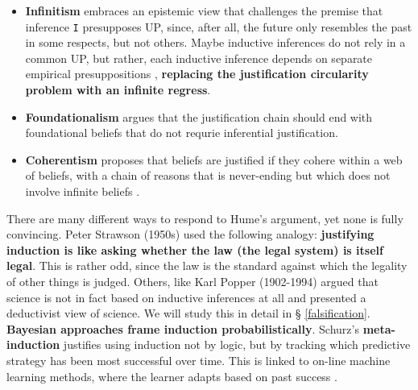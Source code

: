 \documentclass[
  12pt,
]{book}
\providecommand{\tightlist}{%
  \setlength{\itemsep}{0pt}\setlength{\parskip}{0pt}}
\begin{document}
\begin{itemize}
\tightlist
\item
  \textbf{Infinitism} embraces an epistemic view that challenges the premise that inference \texttt{I} presupposes UP, since, after all, the future only resembles the past in some respects, but not others. Maybe inductive inferences do not rely in a common UP, but rather, each inductive inference depends on separate empirical presuppositions \citep{sep-induction-problem}, \textbf{replacing the justification circularity problem with an infinite regress}.
\item
  \textbf{Foundationalism} argues that the justification chain should end with foundational beliefs that do not requrie inferential justification.
\item
  \textbf{Coherentism} proposes that beliefs are justified if they cohere within a web of beliefs, with a chain of reasons that is never-ending but which does not involve infinite beliefs \citep{sep-justep-coherence}.
\end{itemize}

There are many different ways to respond to Hume's argument, yet none is fully convincing. Peter Strawson (1950s) used the following analogy: \textbf{justifying induction is like asking whether the law (the legal system) is itself legal}. This is rather odd, since the law is the standard against which the legality of other things is judged. Others, like Karl Popper (1902-1994) argued that science is not in fact based on inductive inferences at all and presented a deductivist view of science. We will study this in detail in § \ref{falsification}. \textbf{Bayesian approaches frame induction probabilistically}. Schurz's \textbf{meta-induction} justifies using induction not by logic, but by tracking which predictive strategy has been most successful over time. This is linked to on-line machine learning methods, where the learner adapts based on past success \citep{ortner2023adaptive}.
\end{document}
